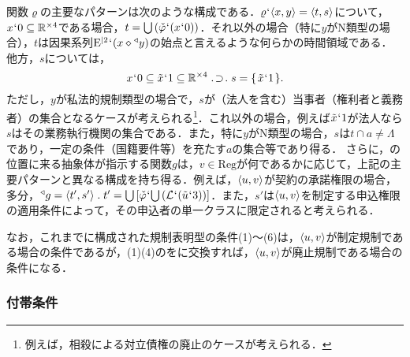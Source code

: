 関数$ \varrho $の主要なパターンは次のような構成である．$\varrho{\mspace{1mu}{`}\mspace{1mu}}\langle x,y \rangle = \langle t,s \rangle$について，$ x{\mspace{1mu}{`}\mspace{1mu}} 0\subseteq\mathbb{R}^{\times 4} $である場合，$ t = {\textstyle\bigcup}\mspace{3mu}(\check{\varphi}{\mspace{1mu}{`}\mspace{1mu}} (x{\mspace{1mu}{`}\mspace{1mu}} 0)) $．それ以外の場合（特に$ y $がN類型の場合），$t$は因果系列$ \mathrm{E}^{\mid 2}{\mspace{1mu}{`}\mspace{1mu}}(x\diamond{^\triangleleft}y) $の始点と言えるような何らかの時間領域である．
他方，$s$については，
\[
    x\fap 0\subseteq \tilde{x}\fap 1\subseteq\timex{\mathbb{R}}{4}\case{1}{1}{1}s = \classab{\tilde{x}\fap 1}.
\]
ただし，$ y $が私法的規制類型の場合で，$s$が（法人を含む）当事者（権利者と義務者）の集合となるケースが考えられる\footnote{例えば，相殺による対立債権の廃止のケースが考えられる．}．これ以外の場合，例えば$ \tilde{x}{\mspace{1mu}{`}\mspace{1mu}} 1 $が法人なら$s$はその業務執行機関の集合である．また，特に$y$がN類型の場合，$ s $は$ t\cap a\neq \Lambda $であり，一定の条件（国籍要件等）を充たす$a$の集合等であり得る．
さらに，\kagi{$ \varrho $}の位置に来る抽象体が指示する関数$g$は，$ v\in\mathrm{Reg} $が何であるかに応じて，上記の主要パターンと異なる構成を持ち得る．例えば，$ \langle u,v \rangle $が契約の承諾権限の場合，多分，$ \trgl{g} = \orp{t',s'}\con{1}t' = \union{[\check{\varphi}\fap\union{(\mathcal{L}\fap(\tilde{u}\fap 3))}]} $．また，$s'$は$\langle u,v \rangle$を制定する申込権限の適用条件によって，その申込者の単一クラスに限定されると考えられる．

なお，これまでに構成された規制表明型の条件(1)〜(6)は，$ \langle u,v \rangle $が制定規制である場合の条件であるが，(1)(4)のをに交換すれば，$\langle u,v \rangle$が廃止規制である場合の条件になる．

\subsubsection{付帯条件}
\label{sssec:付帯条件}

